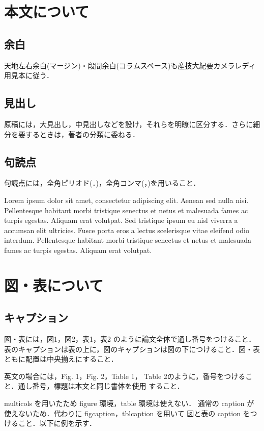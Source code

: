 \begin{multicols}{2}
\section{本文について}

\subsection{余白}
天地左右余白(マージン)・段間余白(コラムスペース)も産技大紀要カメラレディ用見本に従う．

\subsection{見出し}
原稿には，大見出し，中見出しなどを設け，それらを明瞭に区分する．さらに細分を要するときは，著者の分類に委ねる．

\subsection{句読点}
句読点には，全角ピリオド(．)，全角コンマ(，)を用いること．

Lorem ipsum dolor sit amet, consectetur adipiscing elit. Aenean sed
nulla nisi. Pellentesque habitant morbi tristique senectus et netus et malesuada
fames ac turpis egestas. Aliquam erat volutpat. Sed tristique ipsum eu nisl
viverra a accumsan elit ultricies. Fusce porta eros a lectus scelerisque vitae
eleifend odio interdum. Pellentesque habitant morbi tristique senectus et netus
et malesuada fames ac turpis egestas. Aliquam erat volutpat.

\section{図・表について}
\subsection{キャプション}
図・表には，図1，図2，表1，表2 のように論文全体で通し番号をつけること．
表のキャプションは表の上に，図のキャプションは図の下につけること．図・表
ともに配置は中央揃えにすること．

英文の場合には，Fig. 1，Fig. 2，Table 1，
Table 2のように，番号をつけること．通し番号，標題は本文と同じ書体を使用
すること．

multicols を用いたため figure 環境，table 環境は使えない．
通常の caption が使えないため．代わりに figcaption，tblcaption を用いて
図と表の caption をつけること．以下に例を示す．


\end{multicols}
